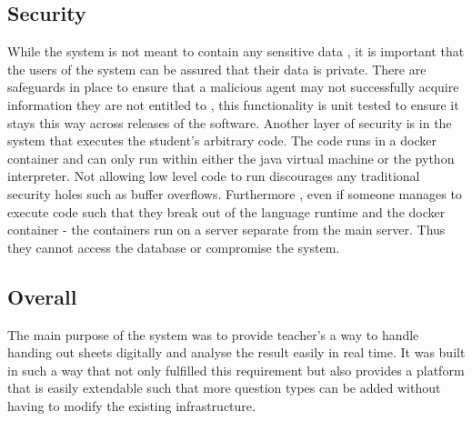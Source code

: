\subsection{Security}
While the system is not meant to contain any sensitive data , it is important that the users of the system can be assured that their data is private. 
There are safeguards in place to ensure that a malicious agent may not successfully acquire information they are not entitled to , this functionality is unit tested to ensure it stays this way across releases of the software.
Another layer of security is in the system that executes the student's arbitrary code.
The code runs in a docker container and can only run within either the java virtual machine or the python interpreter. Not allowing low level code to run discourages any traditional security holes such as buffer overflows.
Furthermore , even if someone manages to execute code such that they break out of the language runtime and the docker container - the containers run on a server separate from the main server. Thus they cannot access the database or compromise the system.

\subsection{Overall}
The main purpose of the system was to provide teacher's a way to handle handing out sheets digitally and analyse the result easily in real time. It was built in such a way that not only fulfilled this requirement but also provides a platform that is easily extendable such that more question types can be added without having to modify the existing infrastructure.



